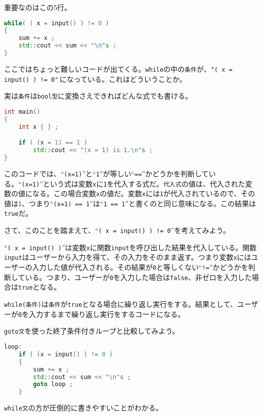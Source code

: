 重要なのはこの5行。

\begin{lstlisting}[language={C++}]
while( ( x = input() ) != 0 )
{
    sum += x ;
    std::cout << sum << "\n"s ;
}
\end{lstlisting}

ここではちょっと難しいコードが出てくる。\texttt{while}の中の\texttt{条件}が、\texttt{"( x = input() ) != 0"}\,になっている。これはどういうことか。

実は\texttt{条件}は\texttt{bool型}に変換さえできればどんな式でも書ける。

\begin{lstlisting}[language={C++}]
int main()
{
    int x { } ;

    if ( (x = 1) == 1 )
        std::cout << "(x = 1) is 1.\n"s ;
}
\end{lstlisting}

このコードでは、``\texttt{(x=1)}''と``\texttt{1}''が等しい``\texttt{==}''かどうかを判断している。``\texttt{(x=1)}''という式は変数\texttt{x}に\texttt{1}を代入する式だ。\texttt{代入式}の値は、代入された変数の値になる。この場合変数\texttt{x}の値だ。変数\texttt{x}には\texttt{1}が代入されているので、その値は1、つまり``\texttt{(x=1) == 1}''は``\texttt{1 == 1}''と書くのと同じ意味になる。この結果は\texttt{true}だ。

さて、このことを踏まえて、``\texttt{( x = input() ) != 0}''を考えてみよう。

``\texttt{( x = input() )}''は変数\texttt{x}に関数\texttt{input}を呼び出した結果を代入している。関数\texttt{input}はユーザーから入力を得て、その入力をそのまま返す。つまり変数\texttt{x}にはユーザーの入力した値が代入される。その結果が\texttt{0}と等しくない``\texttt{!=}''かどうかを判断している。つまり、ユーザーが\texttt{0}を入力した場合は\texttt{false}、非ゼロを入力した場合は\texttt{true}となる。

\texttt{while(条件)}は\texttt{条件}が\texttt{true}となる場合に繰り返し実行をする。結果として、ユーザーが\texttt{0}を入力するまで繰り返し実行をするコードになる。

\texttt{goto文}を使った終了条件付きループと比較してみよう。

\begin{lstlisting}[language={C++}]
loop:
    if ( (x = input() ) != 0 )
    {
        sum += x ;
        std::cout << sum << "\n"s ;
        goto loop ;
    }
\end{lstlisting}

\texttt{while文}の方が圧倒的に書きやすいことがわかる。

